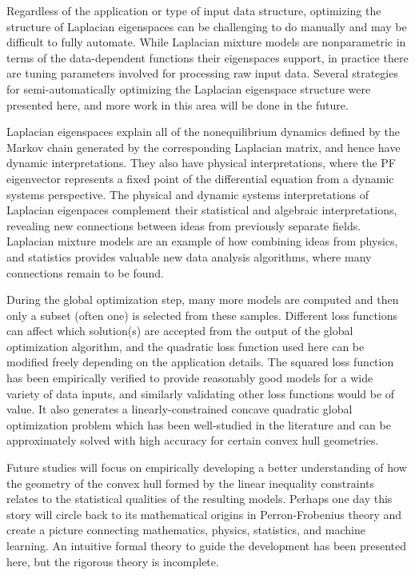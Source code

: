 \documentclass[10pt,letterpaper]{article}
\begin{document}
Regardless of the application or type of input data structure, optimizing the structure of Laplacian eigenspaces can be challenging to do manually and may be difficult to fully automate.
While Laplacian mixture models are nonparametric in terms of the data-dependent functions their eigenspaces support, in practice there are tuning parameters involved for processing raw input data.
Several strategies for semi-automatically optimizing the Laplacian eigenspace structure were presented here, and more work in this area will be done in the future.

Laplacian eigenspaces explain all of the nonequilibrium dynamics defined by the Markov chain generated by the corresponding Laplacian matrix, and hence have dynamic interpretations.
They also have physical interpretations, where the PF eigenvector represents a fixed point of the differential equation from a dynamic systems perspective.
The physical and dynamic systems interpretations of Laplacian eigenpaces complement their statistical and algebraic interpretations, revealing new connections between ideas from previously separate fields.
Laplacian mixture models are an example of how combining ideas from physics, and statistics provides valuable new data analysis algorithms, where many connections remain to be found.

During the global optimization step, many more models are computed and then only a subset (often one) is selected from these samples.
Different loss functions can affect which solution(s) are accepted from the output of the global optimization algorithm, and the quadratic loss function used here can be modified freely depending on the application details.
The squared loss function has been empirically verified to provide reasonably good models for a wide variety of data inputs, and similarly validating other loss functions would be of value.
It also generates a linearly-constrained concave quadratic global optimization problem which has been well-studied in the literature and can be approximately solved with high accuracy for certain convex hull geometries.

Future studies will focus on empirically developing a better understanding of how the geometry of the convex hull formed by the linear inequality constraints relates to the statistical qualities of the resulting models.
Perhaps one day this story will circle back to its mathematical origins in Perron-Frobenius theory and create a picture connecting mathematics, physics, statistics, and machine learning.
An intuitive formal theory to guide the development has been presented here, but the rigorous theory is incomplete.
\end{document}
